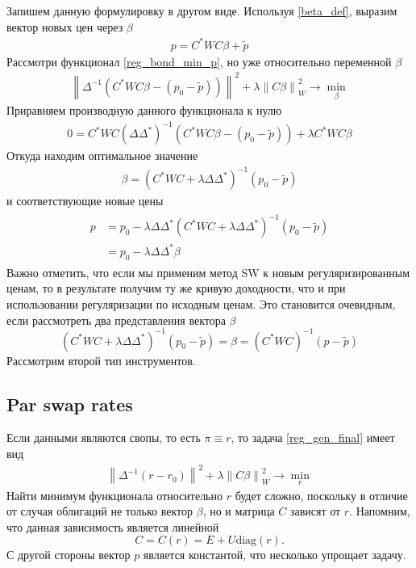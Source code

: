 \documentclass[10pt]{article}
\theoremstyle{definition}
\theoremstyle{remark}
\theoremstyle{plain}
\newcommand{\diag}{\mathrm{diag}}
\begin{document}
Запишем данную формулировку в другом виде. Используя \eqref{beta_def}, выразим вектор новых цен через $\beta$
\begin{align*}
p = C^*WC\beta + \tilde{p}
\end{align*}
Рассмотри функционал \eqref{reg_bond_min_p}, но уже относительно переменной $\beta$ 
\begin{align}
\left\| \Delta^{-1}\left(C^*WC\beta - (p_0 - \tilde{p}) \right)\right\|^2 +
\lambda
\left\|C\beta\right\|^2_W 
\rightarrow \min\limits_{\beta} \label{reg_bond_min_beta}
\end{align}
Приравняем производную данного функционала к нулю
\begin{align*}
0 = C^*WC \left(\Delta\Delta^*\right)^{-1}
\left(
	C^*WC\beta -(p_0-\tilde{p})
\right)
+
\lambda C^*WC \beta
\end{align*}  
Откуда находим оптимальное значение
\begin{align*}
\beta = 
\left(
	C^*WC + \lambda\Delta\Delta^*
\right)^{-1}(p_0-\tilde{p})
\end{align*}
и соответствующие новые цены
\begin{align}
\begin{aligned}
p &= p_0 - \lambda\Delta\Delta^*
\left(C^*WC + \lambda\Delta\Delta^* \right)^{-1}(p_0-\tilde{p})
\\
&= p_0 - \lambda\Delta\Delta^*\beta 
\end{aligned}
\label{bond_price_reg}
\end{align}
Важно отметить, что если мы применим метод SW к новым регуляризированным ценам, то в результате получим ту же кривую доходности, что и при использовании регуляризации по исходным ценам. Это становится очевидным, если рассмотреть два представления вектора $\beta$
$$
\left(
	C^*WC + \lambda\Delta\Delta^*
\right)^{-1}(p_0-\tilde{p})
= \beta = 
(C^*WC)^{-1}(p-\tilde{p})
$$
Рассмотрим второй тип инструментов.

\subsection{Par swap rates}
Если данными являются свопы, то есть $\pi \equiv r$, то задача \eqref{reg_gen_final} имеет вид
\begin{align}
\left\| \Delta^{-1}\left(r - r_0\right)\right\|^2 +
\lambda
\left\|C\beta\right\|^2_W 
\rightarrow \min\limits_r \label{reg_swap_min_r_begin}
\end{align}
Найти минимум функционала относительно $r$ будет сложно, поскольку в отличие от случая облигаций не только вектор $\beta$, но и матрица $C$ зависят от $r$. Напомним, что данная зависимость является линейной
$$
C = C(r) = E+U\diag(r).
$$
С другой стороны вектор $p$ является константой, что несколько упрощает задачу.
\end{document}
